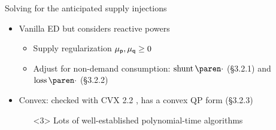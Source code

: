 \begin{frame}[t]{Solving for the anticipated supply injections}{}
    \begin{itemize}
        \item <1-> Vanilla ED but considers reactive powers
        \begin{itemize}
            \item <1-> \textcolor<1>{CornellRed}{Supply regularization
                \(\XEDReg{p},\XEDReg{q} \geq 0\)}
            \item <1-> \textcolor<2>{CornellRed}{Adjust for non-demand consumption}:
                \(\XEDShun{\cdot}\) (\S 3.2.1) and \(\XEDLoss{\cdot}\) (\S 3.2.2)
        \end{itemize}

        \item <3> \textcolor<3>{CornellRed}{Convex}:
            checked with CVX 2.2 \cite{CVX_v2.2}, has a convex QP form (\S 3.2.3)
        \begin{itemize}
            \item[\ding{43}] <3> Lots of well-established polynomial-time algorithms
        \end{itemize}
    \end{itemize}
\end{frame}
